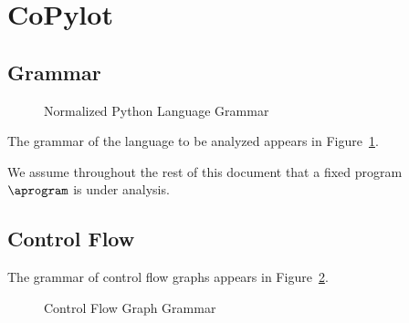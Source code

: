 \documentclass{article}
\begin{document}
    \section{CoPylot}

    \subsection{Grammar}

    \begin{figure}\center
        \begin{grammar}

        \end{grammar}
        \caption{Normalized Python Language Grammar}
        \label{fig_languageGrammar}
    \end{figure}

    The grammar of the language to be analyzed appears in Figure~\ref{fig_languageGrammar}.

    We assume throughout the rest of this document that a fixed program $\aprogram$ is under analysis.  

    \subsection{Control Flow}

    The grammar of control flow graphs appears in Figure~\ref{fig_cfgGrammar}.  

    \begin{figure}\center
        \begin{grammar}
        \end{grammar}
        \caption{Control Flow Graph Grammar}
        \label{fig_cfgGrammar}
    \end{figure}
\end{document}
